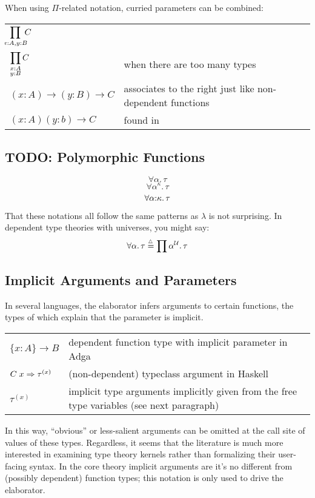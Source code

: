 \documentclass[11pt]{article} %
\theoremstyle{definition}
\theoremstyle{remark}
\begin{document}
When using $\Pi$-related notation, curried parameters can be combined:
\begin{center}
\renewcommand{\arraystretch}{1.2}
\begin{tabular}{lp{8.2cm}}
$\displaystyle\prod_{\mathclap{x \ordcolon A, y \ordcolon B}}\;C$ &  \\
$\displaystyle\prod_{\substack{x \mathord: A \\ y \mathord: B}}C$ & when there are too many types \\
$(x : A) \to (y : B) \to C$ & associates to the right just like non-dependent functions \\
$(x:A)(y:b) \to C$ & found in \cite{kaposi_2020} \\
\end{tabular}
\end{center}

\subsection{TODO: Polymorphic Functions}

$$\forall \alpha.\,\tau$$
$$\forall \alpha^\kappa.\,\tau$$
$$\forall \alpha\mathord:\kappa.\,\tau$$

That these notations all follow the same patterns as $\lambda$ is not surprising.
In dependent type theories with universes, you might say:
$$\forall \alpha.\,\tau \trieq \prod \alpha^\mathcal U.\,\tau$$

\subsection{Implicit Arguments and Parameters}

In several languages, the elaborator infers arguments to certain functions, the types of which explain that the parameter is implicit.
\begin{center}
\renewcommand{\arraystretch}{1.2}
\begin{tabular}{lp{8.2cm}}
$\{x : A\} \to B$ & dependent function type with implicit parameter in Adga \\
$C\;x \Rightarrow \tau^{(x)}$ & (non-dependent) typeclass argument in Haskell \\
$\tau^{(x)}$ & implicit type arguments implicitly given from the free type variables (see next paragraph) \\
\end{tabular}
\end{center}
In this way, ``obvious'' or less-salient arguments can be omitted at the call site of values of these types.
Regardless, it seems that the literature is much more interested in examining type theory kernels rather than formalizing their user-facing syntax.
In the core theory implicit arguments are it's no different from (possibly dependent) function types; this notation is only used to drive the elaborator.
\end{document}
